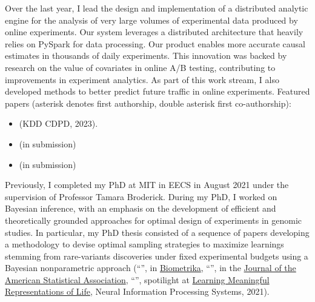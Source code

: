 \begin{itemize}
{    Over the last year, I lead the design and implementation of a distributed analytic engine for the analysis of very large volumes of experimental data produced by online experiments.
    Our system leverages a distributed architecture that heavily relies on PySpark for data processing. 
    Our product enables more accurate causal estimates in thousands of daily experiments. 
     This innovation was backed by research on the value of covariates in online A/B testing, contributing to improvements in experiment analytics.
     As part of this work stream, I also developed methods to better predict future traffic in online experiments. Featured papers (asterisk denotes first authorship, double asterisk first co-authorship):}
     \small{
    \begin{itemize}
        \item  \href{https://proceedings.mlr.press/v218/masoero23a.html}{\color{blue}{Leveraging Covariate Adjustments at Scale in Online A/B Testing*}} (KDD CDPD, 2023).
        \item \href{https://arxiv.org/pdf/2402.03231}{\color{blue}{Improved prediction of future online activity in online A/B testing*}} (in submission)
        \item \href{https://arxiv.org/abs/2401.14722}{\color{blue}{A Nonparametric Bayes Approach to Online Activity Prediction*}} (in submission)
    \end{itemize}
    }
\end{itemize}

Previously, I completed my PhD at MIT in EECS in August 2021 under the supervision of Professor Tamara Broderick. 
During my PhD, I worked on Bayesian inference, with an emphasis on the development of efficient and theoretically grounded approaches for optimal design of experiments in genomic studies. In particular, my PhD thesis consisted of a sequence of papers developing a methodology to devise optimal sampling strategies to maximize learnings stemming from rare-variants discoveries under fixed experimental budgets  using a Bayesian nonparametric approach (``\href{https://academic.oup.com/biomet/article-abstract/109/1/17/6146908?redirectedFrom=fulltext}{\color{blue}{More for Less: Predicting and maximizing genetic variant discovery via Bayesian nonparametrics}}'', in \href{https://academic.oup.com/biomet/advance-article-abstract/doi/10.1093/biomet/asab012/6146908?redirectedFrom=PDF}{Biometrika}, ``\href{https://www.tandfonline.com/doi/full/10.1080/01621459.2022.2115918}{\color{blue}{Scaled process priors: Improved predictions and uncertainties for new-feature counts via random scaling in Bayesian nonparametrics}}'', in the \href{https://www.tandfonline.com/doi/full/10.1080/01621459.2022.2115918}{Journal of the American Statistical Association},  ``\href{https://arxiv.org/abs/2112.02032}{\color{blue}{Bayesian nonparametric strategies for power maximization in rare variants association studies}}'', spotilight at \href{https://www.lmrl.org/}{Learning Meaningful Representations of Life},  Neural Information Processing Systems, 2021).